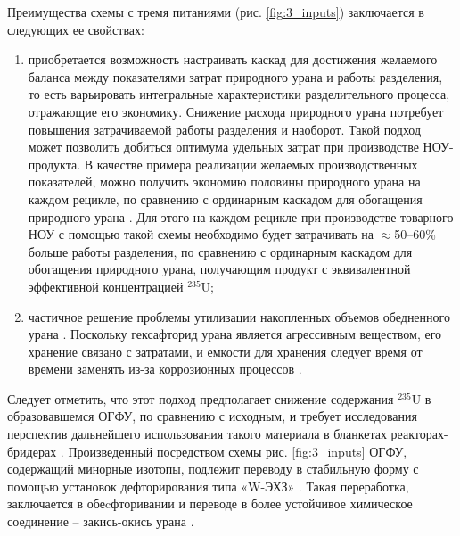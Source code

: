 Преимущества схемы с тремя питаниями (рис. \ref{fig:3_inputs}) заключается в следующих ее свойствах:

\begin{enumerate}
  \item приобретается возможность настраивать каскад для достижения желаемого баланса между показателями затрат природного урана и работы разделения, то есть варьировать интегральные характеристики разделительного процесса, отражающие его экономику. Снижение расхода природного урана потребует повышения затрачиваемой работы разделения и наоборот. Такой подход может позволить добиться оптимума удельных затрат при производстве НОУ-продукта. В качестве примера реализации желаемых производственных показателей, можно получить экономию половины природного урана на каждом рецикле, по сравнению с ординарным каскадом для обогащения природного урана   \cite{smirnovApplyingEnrichmentCapacities2018}. Для этого на каждом рецикле при производстве товарного НОУ с помощью такой схемы необходимо будет затрачивать на $\approx$50--60\% больше работы разделения, по сравнению с ординарным каскадом для обогащения природного урана, получающим продукт с эквивалентной эффективной концентрацией $^{235}$U;
  \item частичное решение проблемы утилизации накопленных объемов обедненного урана \cite{smirnovEnrichmentRegeneratedUranium2014}. Поскольку гексафторид урана является агрессивным веществом, его хранение связано с затратами, и емкости для хранения следует время от времени заменять из-за коррозионных процессов \cite{fitchOPTIONSDISPOSALREAPPLICATION2009, oecdManagementDepletedUranium2001}.
\end{enumerate}

Следует отметить, что этот подход предполагает снижение содержания $^{235}$U в образовавшемся ОГФУ, по сравнению с исходным, и требует исследования перспектив дальнейшего использования такого материала в бланкетах реакторах-бридерах \cite{smirnovApplyingEnrichmentCapacities2018}.
Произведенный посредством схемы рис. \ref{fig:3_inputs} ОГФУ, содержащий минорные изотопы, подлежит переводу в стабильную форму с помощью установок дефторирования типа «W-ЭХЗ» \cite{RosatomGoskorporaciyaRosatoma}. Такая переработка, заключается в обеcфторивании и переводе в более устойчивое химическое соединение -- закись-окись урана  \cite{PererabotkaOGFUObrazovaniem2014}.

